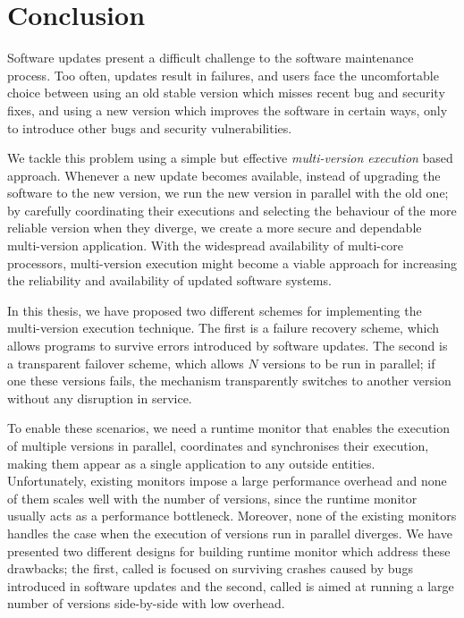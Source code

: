 \chapter{Conclusion}
\label{chap:conclusion}

Software updates present a difficult challenge to the software maintenance
process. Too often, updates result in failures, and users face the
uncomfortable choice between using an old stable version which misses recent
bug and security fixes, and using a new version which improves the software in
certain ways, only to introduce other bugs and security vulnerabilities.

We tackle this problem using a simple but effective \emph{multi-version
execution} based approach. Whenever a new update becomes available, instead of
upgrading the software to the new version, we run the new version in parallel
with the old one; by carefully coordinating their executions and selecting the
behaviour of the more reliable version when they diverge, we create a more
secure and dependable multi-version application. With the widespread
availability of multi-core processors, multi-version execution might become a
viable approach for increasing the reliability and availability of updated
software systems.

In this thesis, we have proposed two different schemes for implementing the
multi-version execution technique. The first is a failure recovery scheme,
which allows programs to survive errors introduced by software updates. The
second is a transparent failover scheme, which allows $N$ versions to be run in
parallel; if one these versions fails, the mechanism transparently switches to
another version without any disruption in service.

To enable these scenarios, we need a runtime monitor that enables the execution
of multiple versions in parallel, coordinates and synchronises their execution,
making them appear as a single application to any outside entities.
Unfortunately, existing monitors impose a large performance overhead and none
of them scales well with the number of versions, since the runtime monitor
usually acts as a performance bottleneck. Moreover, none of the existing
monitors handles the case when the execution of versions run in parallel
diverges. We have presented two different designs for building runtime monitor
which address these drawbacks; the first, called \mx is focused on surviving
crashes caused by bugs introduced in software updates and the second, called
\varan is aimed at running a large number of versions side-by-side with low
overhead.

